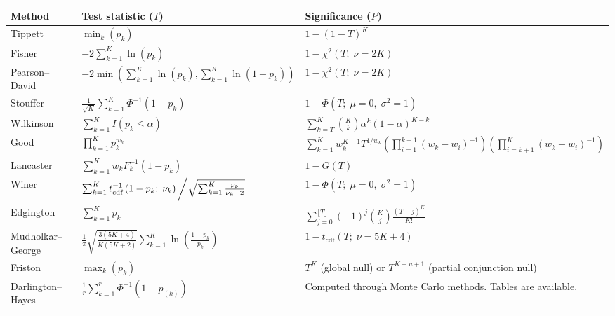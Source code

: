 \begin{sidewaystable}
\begin{center}
{\footnotesize
\begin{tabular}{@{}m{3.6cm}@{}m{6.7cm}<{\raggedright}@{}m{12.2cm}<{\raggedright}@{}}
\toprule
\label{tab:comparisonT} Method & Test statistic ($T$) & Significance ($P$)\\
\midrule
Tippett &
$\min_{k} \left(p_{k}\right)$ &
$1-\left(1-T\right)^{K}$ \\
\midrule[0pt]
Fisher &
$-2 \sum_{k=1}^{K} \ln\left(p_{k}\right)$ &
$1-\chi^{2}\left(T;\;\nu=2K\right)$\\
\midrule[0pt]
Pearson--David &
$-2\min\left(\sum_{k=1}^{K} \ln\left(p_{k}\right),\sum_{k=1}^{K} \ln\left(1-p_{k}\right)\right)$ &
$1-\chi^{2}\left(T;\;\nu=2K\right)$\\
\midrule[0pt]
Stouffer &
$\frac{1}{\sqrt{K}} \sum_{k=1}^{K} \Phi^{-1}\left(1-p_{k}\right)$ &
$1-\Phi\left(T;\;\mu=0,\;\sigma^2=1\right)$\\
\midrule[0pt]
Wilkinson &
$\sum_{k=1}^{K} I\left(p_{k}\leqslant\alpha\right)$ &
$\sum_{k=T}^{K}\binom{K}{k}\alpha^{k}(1-\alpha)^{K-k}$ \\
\midrule[0pt]
Good &
$\prod_{k=1}^{K} p_{k}^{w_{k}}$ &
$\sum_{k=1}^{K}w_{k}^{K-1}T^{1/w_{k}}\left(\prod_{i=1}^{k-1}\left(w_{k}-w_{i}\right)^{-1}\right) \left(\prod_{i=k+1}^{K}\left(w_{k}-w_{i}\right)^{-1}\right)$\\
\midrule[0pt]
Lancaster &
$\sum_{k=1}^{K} w_{k}F_{k}^{-1}\left(1-p_{k}\right)$ &
$1-G\left(T\right)$\\
\midrule[0pt]
Winer &
$\sum_{k=1}^{K}t_{\text{cdf}}^{-1}\left(1-p_{k};\;\nu_{k}\right)\left/\sqrt{\sum_{k=1}^{K}\frac{\nu_{k}}{\nu_{k}-2}}\right.$ &
$1-\Phi\left(T;\;\mu=0,\;\sigma^2=1\right)$\\
\midrule[0pt]
Edgington &
$\sum_{k=1}^{K} p_{k}$& 
$\sum_{j=0}^{\lfloor T \rfloor}(-1)^j \binom{K}{j}\frac{\left(T-j\right)^K}{K!}$ \\
\midrule[0pt]
Mudholkar--George &
$\frac{1}{\pi}\sqrt{\frac{3(5K+4)}{K(5K+2)}}\sum_{k=1}^{K} \ln\left(\frac{1-p_{k}}{p_{k}}\right)$ &
$1-t_{\text{cdf}}(T;\;\nu=5K+4)$\\
\midrule[0pt]
Friston &
$\max_{k} \left(p_{k}\right)$ &
$T^{K}$ (global null) or $T^{K-u+1}$ (partial conjunction null)\\
\midrule[0pt]
Darlington--Hayes &
$\frac{1}{r} \sum_{k=1}^{r} \Phi^{-1}\left(1-p_{(k)}\right)$ &
Computed through Monte Carlo methods. Tables are available.\\
\midrule[0pt]

\end{tabular}}
\end{center}
\end{sidewaystable}
